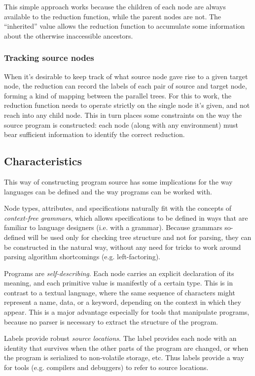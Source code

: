 This simple approach works because the children of each node are always available to the reduction function, while the parent nodes are not. The ``inherited'' value allows the reduction function to accumulate some information about the otherwise inaccessible ancestors.

\subsubsection{Tracking source nodes}
When it's desirable to keep track of what source node gave rise to a given target node, the reduction can record the labels of each pair of source and target node, forming a kind of mapping between the parallel trees. For this to work, the reduction function needs to operate strictly on the single node it's given, and not reach into any child node. This in turn places some constraints on the way the source program is constructed: each node (along with any environment) must bear sufficient information to identify the correct reduction.



\subsection{Characteristics}
This way of constructing program source has some implications for the way languages can be defined and the way programs can be worked with.

Node types, attributes, and specifications naturally fit with the concepts of \emph{context-free grammars}, which allows specifications to be defined in ways that are familiar to language designers (i.e. with a grammar). Because grammars so-defined will be used only for checking tree structure and not for parsing, they can be constructed in the natural way, without any need for tricks to work around parsing algorithm shortcomings (e.g. left-factoring).

Programs are \emph{self-describing}. Each node carries an explicit declaration of its meaning, and each primitive value is manifestly of a certain type. This is in contrast to a textual language, where the same sequence of characters might represent a name, data, or a keyword, depending on the context in which they appear. This is a major advantage especially for tools that manipulate programs, because no parser is necessary to extract the structure of the program.

Labels provide robust \emph{source locations}. The label provides each node with an identity that survives when the other parts of the program are changed, or when the program is serialized to non-volatile storage, etc. Thus labels provide a way for tools (e.g. compilers and debuggers) to refer to source locations. 

